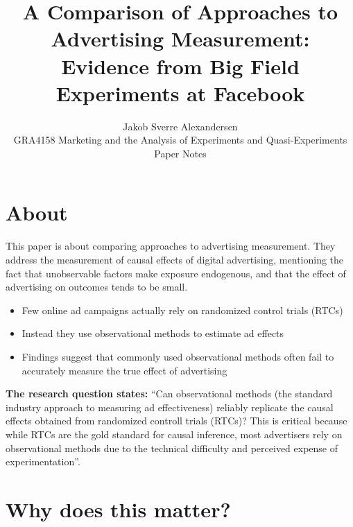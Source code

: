 \documentclass[10pt]{article}
\begin{document}
 
\title{A Comparison of Approaches to Advertising Measurement:\\Evidence from Big Field Experiments at Facebook}
\author{Jakob Sverre Alexandersen\\
GRA4158 Marketing and the Analysis of Experiments and Quasi-Experiments\\
Paper Notes}
\maketitle

\tableofcontents
\newpage
\section{About}
This paper is about comparing approaches to advertising measurement. They address the measurement of causal effects of digital advertising, mentioning the fact that unobservable factors make exposure endogenous, and that the effect of advertising on outcomes tends to be small. 
\begin{itemize}
    \item Few online ad campaigns actually rely on randomized control trials (RTCs)
    \item Instead they use observational methods to estimate ad effects 
    \item Findings suggest that commonly used observational methods often fail to accurately measure the true effect of advertising
\end{itemize}
\textbf{The research question states:} ``Can observational methods (the standard industry approach to measuring ad effectiveness) reliably replicate the causal effects obtained from randomized controll trials (RTCs)? This is critical because while RTCs are the gold standard for causal inference, most advertisers rely on observational methods due to the technical difficulty and perceived expense of experimentation''.
\section{Why does this matter?}
\end{document}
